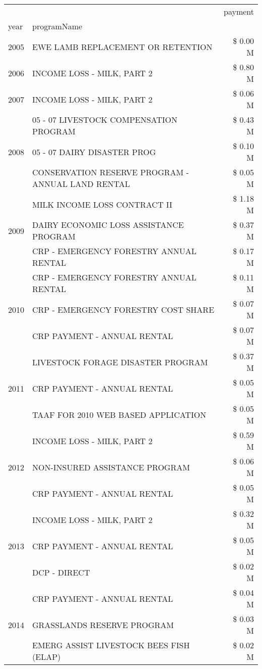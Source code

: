 \begin{tabular}{llr}
\toprule
 &  & payment \\
year & programName &  \\
\midrule
2005 & EWE LAMB REPLACEMENT OR RETENTION & \$ 0.00 M \\
\cline{1-3}
2006 & INCOME LOSS - MILK, PART 2 & \$ 0.80 M \\
\cline{1-3}
2007 & INCOME LOSS - MILK, PART 2 & \$ 0.06 M \\
\cline{1-3}
\multirow[t]{3}{*}{2008} & 05 - 07 LIVESTOCK COMPENSATION PROGRAM & \$ 0.43 M \\
 & 05 - 07 DAIRY DISASTER PROG & \$ 0.10 M \\
 & CONSERVATION RESERVE PROGRAM - ANNUAL LAND RENTAL & \$ 0.05 M \\
\cline{1-3}
\multirow[t]{3}{*}{2009} & MILK INCOME LOSS CONTRACT II & \$ 1.18 M \\
 & DAIRY ECONOMIC LOSS ASSISTANCE PROGRAM & \$ 0.37 M \\
 & CRP - EMERGENCY FORESTRY ANNUAL RENTAL & \$ 0.17 M \\
\cline{1-3}
\multirow[t]{3}{*}{2010} & CRP - EMERGENCY FORESTRY ANNUAL RENTAL & \$ 0.11 M \\
 & CRP - EMERGENCY FORESTRY COST SHARE & \$ 0.07 M \\
 & CRP PAYMENT - ANNUAL RENTAL & \$ 0.07 M \\
\cline{1-3}
\multirow[t]{3}{*}{2011} & LIVESTOCK FORAGE DISASTER PROGRAM & \$ 0.37 M \\
 & CRP PAYMENT - ANNUAL RENTAL & \$ 0.05 M \\
 & TAAF FOR 2010 WEB BASED APPLICATION & \$ 0.05 M \\
\cline{1-3}
\multirow[t]{3}{*}{2012} & INCOME LOSS - MILK, PART 2 & \$ 0.59 M \\
 & NON-INSURED ASSISTANCE PROGRAM & \$ 0.06 M \\
 & CRP PAYMENT - ANNUAL RENTAL & \$ 0.05 M \\
\cline{1-3}
\multirow[t]{3}{*}{2013} & INCOME LOSS - MILK, PART 2 & \$ 0.32 M \\
 & CRP PAYMENT - ANNUAL RENTAL & \$ 0.05 M \\
 & DCP - DIRECT & \$ 0.02 M \\
\cline{1-3}
\multirow[t]{3}{*}{2014} & CRP PAYMENT - ANNUAL RENTAL & \$ 0.04 M \\
 & GRASSLANDS RESERVE PROGRAM & \$ 0.03 M \\
 & EMERG ASSIST LIVESTOCK BEES FISH (ELAP) & \$ 0.02 M \\

\end{tabular}
